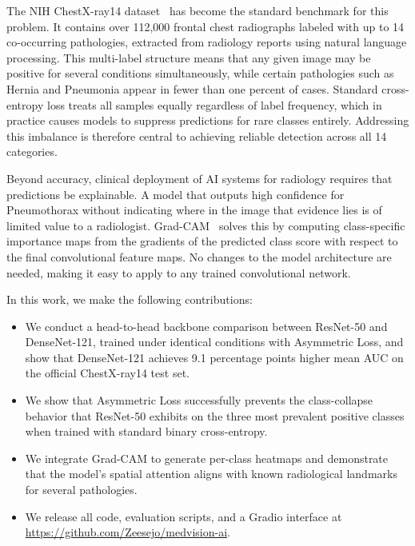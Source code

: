 \documentclass[runningheads]{llncs}
\begin{document}
The NIH ChestX-ray14 dataset~\cite{wang2017chestxray14} has become
the standard benchmark for this problem. It contains over 112,000
frontal chest radiographs labeled with up to 14 co-occurring
pathologies, extracted from radiology reports using natural
language processing. This multi-label structure means that any
given image may be positive for several conditions simultaneously,
while certain pathologies such as Hernia and Pneumonia appear in
fewer than one percent of cases. Standard cross-entropy loss
treats all samples equally regardless of label frequency, which in
practice causes models to suppress predictions for rare classes
entirely. Addressing this imbalance is therefore central to
achieving reliable detection across all 14 categories.

Beyond accuracy, clinical deployment of AI systems for radiology
requires that predictions be explainable. A model that outputs
high confidence for Pneumothorax without indicating where in the
image that evidence lies is of limited value to a radiologist.
Grad-CAM~\cite{selvaraju2017gradcam} solves this by computing
class-specific importance maps from the gradients of the predicted
class score with respect to the final convolutional feature maps.
No changes to the model architecture are needed, making it easy
to apply to any trained convolutional network.

In this work, we make the following contributions:
\begin{itemize}
  \item We conduct a head-to-head backbone comparison between
        ResNet-50 and DenseNet-121, trained under identical
        conditions with Asymmetric Loss, and show that
        DenseNet-121 achieves 9.1 percentage points higher
        mean AUC on the official ChestX-ray14 test set.
  \item We show that Asymmetric Loss successfully prevents
        the class-collapse behavior that ResNet-50 exhibits
        on the three most prevalent positive classes when
        trained with standard binary cross-entropy.
  \item We integrate Grad-CAM to generate per-class heatmaps
        and demonstrate that the model's spatial attention
        aligns with known radiological landmarks for several
        pathologies.
  \item We release all code, evaluation scripts, and a Gradio
        interface at \url{https://github.com/Zeesejo/medvision-ai}.
\end{itemize}
\end{document}
